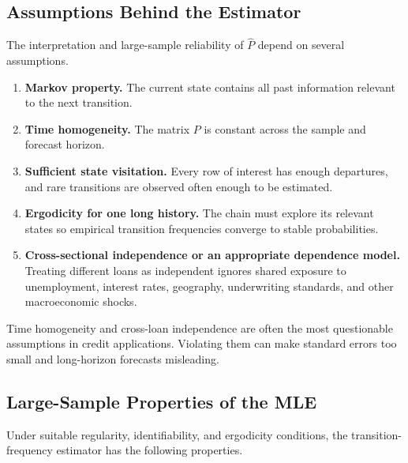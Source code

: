 \documentclass[12pt,openany]{book}
\theoremstyle{definition}
\theoremstyle{remark}
\begin{document}
\subsection{Assumptions Behind the Estimator}

The interpretation and large-sample reliability of \(\widehat P\) depend on
several assumptions.

\begin{enumerate}
    \item \textbf{Markov property.} The current state contains all past
    information relevant to the next transition.

    \item \textbf{Time homogeneity.} The matrix \(P\) is constant across the
    sample and forecast horizon.

    \item \textbf{Sufficient state visitation.} Every row of interest has
    enough departures, and rare transitions are observed often enough to be
    estimated.

    \item \textbf{Ergodicity for one long history.} The chain must explore
    its relevant states so empirical transition frequencies converge to
    stable probabilities.

    \item \textbf{Cross-sectional independence or an appropriate dependence
    model.} Treating different loans as independent ignores shared exposure
    to unemployment, interest rates, geography, underwriting standards, and
    other macroeconomic shocks.
\end{enumerate}

Time homogeneity and cross-loan independence are often the most questionable
assumptions in credit applications. Violating them can make standard errors
too small and long-horizon forecasts misleading.

\subsection{Large-Sample Properties of the MLE}

Under suitable regularity, identifiability, and ergodicity conditions, the
transition-frequency estimator has the following properties.
\end{document}
